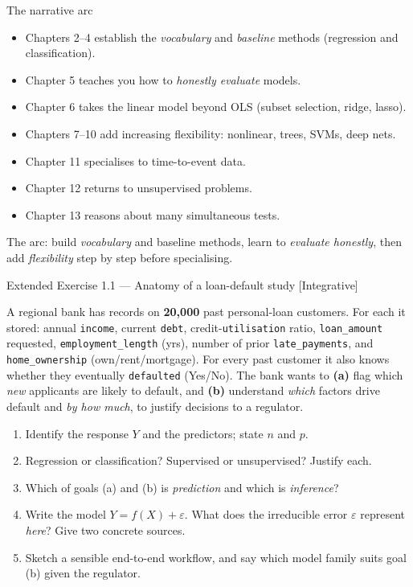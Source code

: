 \documentclass[aspectratio=169,11pt]{beamer}
\begin{document}
\begin{frame}{The narrative arc}
  \begin{itemize}
    \item Chapters 2--4 establish the \emph{vocabulary} and
          \emph{baseline} methods (regression and classification).
    \item Chapter 5 teaches you how to \emph{honestly evaluate}
          models.
    \item Chapter 6 takes the linear model beyond OLS (subset
          selection, ridge, lasso).
    \item Chapters 7--10 add increasing flexibility: nonlinear, trees,
          SVMs, deep nets.
    \item Chapter 11 specialises to time-to-event data.
    \item Chapter 12 returns to unsupervised problems.
    \item Chapter 13 reasons about many simultaneous tests.
  \end{itemize}
  \begin{takeaway}The arc: build \emph{vocabulary} and baseline methods, learn to \emph{evaluate honestly}, then add \emph{flexibility} step by step before specialising.\end{takeaway}
\end{frame}


\begin{frame}{Extended Exercise 1.1 --- Anatomy of a loan-default study [Integrative]}
\begin{longexercise}
A regional bank has records on \textbf{20{,}000} past personal-loan customers. For each it stored: annual \texttt{income}, current \texttt{debt}, credit-\texttt{utilisation} ratio, \texttt{loan\_amount} requested, \texttt{employment\_length} (yrs), number of prior \texttt{late\_payments}, and \texttt{home\_ownership} (own/rent/mortgage). For every past customer it also knows whether they eventually \texttt{defaulted} (Yes/No). The bank wants to \textbf{(a)} flag which \emph{new} applicants are likely to default, and \textbf{(b)} understand \emph{which} factors drive default and \emph{by how much}, to justify decisions to a regulator.
\begin{enumerate}\setlength\itemsep{1pt}
  \item Identify the response $Y$ and the predictors; state $n$ and $p$.
  \item Regression or classification? Supervised or unsupervised? Justify each.
  \item Which of goals (a) and (b) is \emph{prediction} and which is \emph{inference}?
  \item Write the model $Y=f(X)+\varepsilon$. What does the irreducible error $\varepsilon$ represent \emph{here}? Give two concrete sources.
  \item Sketch a sensible end-to-end workflow, and say which model family suits goal (b) given the regulator.
\end{enumerate}
\end{longexercise}
\end{frame}
\end{document}
